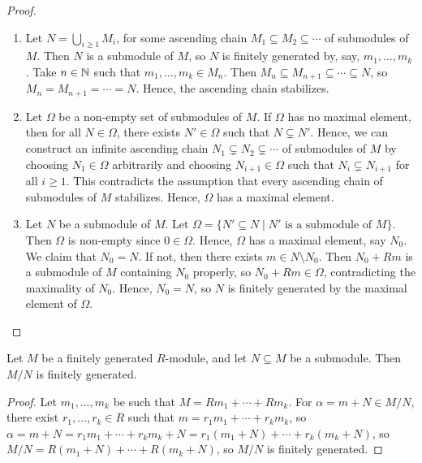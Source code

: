 \begin{proof}
    \begin{enumerate}[label=\arabic*.]
        \item Let $N = \bigcup_{i \geq 1} M_{i}$, for some ascending chain $M_{1} \subseteq M_{2} \subseteq \cdots$ of submodules of $M$. Then $N$ is a submodule of $M$, so $N$ is finitely generated by, say, $m_{1},\ldots,m_{k}$. Take $n \in \mathbb{N}$ such that $m_{1},\ldots,m_{k} \in M_{n}$. Then $M_{n} \subseteq M_{n+1} \subseteq \cdots \subseteq N$, so $M_{n} = M_{n+1} = \cdots = N$. Hence, the ascending chain stabilizes.
        \item Let $\Omega$ be a non-empty set of submodules of $M$. If $\Omega$ has no maximal element, then for all $N \in \Omega$, there exists $N' \in \Omega$ such that $N \subsetneq N'$. Hence, we can construct an infinite ascending chain $N_{1} \subsetneq N_{2} \subsetneq \cdots$ of submodules of $M$ by choosing $N_{1} \in \Omega$ arbitrarily and choosing $N_{i+1} \in \Omega$ such that $N_{i} \subsetneq N_{i+1}$ for all $i \geq 1$. This contradicts the assumption that every ascending chain of submodules of $M$ stabilizes. Hence, $\Omega$ has a maximal element.
        \item Let $N$ be a submodule of $M$. Let $\Omega = \{N' \subseteq N \mid N' \text{ is a submodule of } M\}$. Then $\Omega$ is non-empty since $0 \in \Omega$. Hence, $\Omega$ has a maximal element, say $N_{0}$. We claim that $N_{0} = N$. If not, then there exists $m \in N \setminus N_{0}$. Then $N_{0} + Rm$ is a submodule of $M$ containing $N_{0}$ properly, so $N_{0} + Rm \in \Omega$, contradicting the maximality of $N_{0}$. Hence, $N_{0} = N$, so $N$ is finitely generated by the maximal element of $\Omega$.
    \end{enumerate}
\end{proof}

\begin{proposition}
    Let $M$ be a finitely generated $R$-module, and let $N \subseteq M$ be a submodule. Then $M/N$ is finitely generated.
\end{proposition}

\begin{proof}
    Let $m_{1},\ldots,m_{k}$ be such that $M = Rm_{1} + \cdots + Rm_{k}$. For $\alpha = m + N \in M/N$, there exist $r_{1},\ldots,r_{k} \in R$ such that $m = r_{1}m_{1} + \cdots + r_{k}m_{k}$, so $\alpha = m + N = r_{1}m_{1} + \cdots + r_{k}m_{k} + N = r_{1}(m_{1}+N) + \cdots + r_{k}(m_{k}+N)$, so $M/N = R(m_{1}+N) + \cdots + R(m_{k}+N)$, so $M/N$ is finitely generated.
\end{proof}

